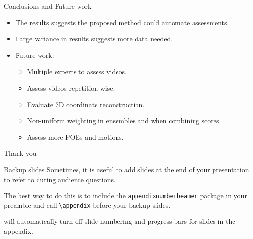 \begin{frame}[fragile]{Conclusions and Future work}
  \begin{itemize}
    \item The results suggests the proposed method could automate assessments.
    \item Large variance in results suggests more data needed.
    \item Future work:
          \begin{itemize}
            \item Multiple experts to assess videos.
            \item Assess videos repetition-wise.
            \item Evaluate 3D coordinate reconstruction.
            \item Non-uniform weighting in ensembles and when combining scores.
            \item Assess more POEs and motions.
          \end{itemize}
  \end{itemize}

\end{frame}

\begin{frame}[standout]
  Thank you
\end{frame}

\appendix

\begin{frame}[fragile]{Backup slides}
  Sometimes, it is useful to add slides at the end of your presentation to
  refer to during audience questions.

  The best way to do this is to include the \verb|appendixnumberbeamer|
  package in your preamble and call \verb|\appendix| before your backup slides.

  \themename will automatically turn off slide numbering and progress bars for
  slides in the appendix.
\end{frame}




